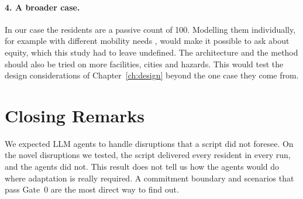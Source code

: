 \paragraph{4. A broader case.} In our case the residents are a passive count
of 100. Modelling them individually, for example with different mobility
needs \parencite{alqahtani2025a}, would make it possible to ask about equity, which this study had to
leave undefined. The architecture and the method should also be tried on more
facilities, cities and hazards. This would test the design considerations of
Chapter~\ref{ch:design} beyond the one case they come from.

\section{Closing Remarks}
\label{sec:concl:closing}

We expected LLM agents to handle disruptions that a script did not foresee.
On the novel disruptions we tested, the script delivered every resident in
every run, and the agents did not. This result does not tell us how the agents would do where
adaptation is really required. A commitment boundary and scenarios that pass
Gate~0 are the most direct way to find out.

